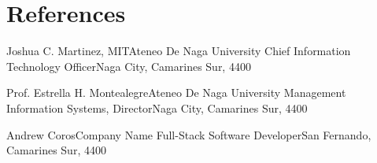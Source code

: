 \section{References}
    \resumeSubHeadingListStart
        \resumeSubheading
        {Joshua C. Martinez, MIT}{Ateneo De Naga University}
        {Chief Information Technology Officer}{Naga City, Camarines Sur, 4400}
        \resumeItemListStart
        \resumeItemListEnd
        
        \resumeSubheading
        {Prof. Estrella H. Montealegre}{Ateneo De Naga University}
        {Management Information Systems, Director}{Naga City, Camarines Sur, 4400}
        \resumeItemListStart
        \resumeItemListEnd

        
        \resumeSubheading
        {Andrew Coros}{Company Name}
        {Full-Stack Software Developer}{San Fernando, Camarines Sur, 4400}
        \resumeItemListStart
        \resumeItemListEnd
    
    \resumeSubHeadingListEnd